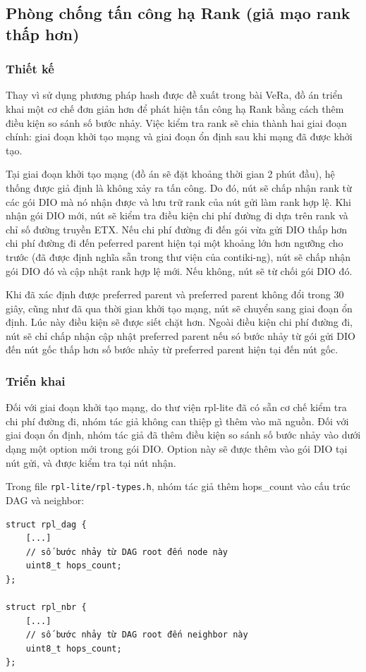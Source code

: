 \subsection{Phòng chống tấn công hạ Rank (giả mạo rank thấp hơn)}
\label{prevention:rank-attacks}
\subsubsection{Thiết kế}
Thay vì sử dụng phương pháp hash được đề xuất trong bài VeRa, đồ án triển khai một cơ chế đơn giản hơn để phát hiện tấn công hạ Rank bằng cách thêm điều kiện so sánh số bước nhảy. Việc kiểm tra rank sẽ chia thành hai giai đoạn chính: giai đoạn khởi tạo mạng và giai đoạn ổn định sau khi mạng đã được khởi tạo.

Tại giai đoạn khởi tạo mạng (đồ án sẽ đặt khoảng thời gian 2 phút đầu), hệ thống được giả định là không xảy ra tấn công. Do đó, nút sẽ chấp nhận rank từ các gói DIO mà nó nhận được và lưu trữ rank của nút gửi làm rank hợp lệ. Khi nhận gói DIO mới, nút sẽ kiểm tra điều kiện chi phí đường đi dựa trên rank và chỉ số đường truyền ETX. Nếu chi phí đường đi đến gói vừa gửi DIO thấp hơn chi phí đường đi đến peferred parent hiện tại một khoảng lớn hơn ngưỡng cho trước (đã được định nghĩa sẵn trong thư viện của contiki-ng), nút sẽ chấp nhận gói DIO đó và cập nhật rank hợp lệ mới. Nếu không, nút sẽ từ chối gói DIO đó.

Khi đã xác định được preferred parent và preferred parent không đổi trong 30 giây, cũng như đã qua thời gian khởi tạo mạng, nút sẽ chuyển sang giai đoạn ổn định. Lúc này điều kiện sẽ được siết chặt hơn. Ngoài điều kiện chi phí đường đi, nút sẽ chỉ chấp nhận cập nhật preferred parent nếu só bước nhảy từ gói gửi DIO đến nút gốc thấp hơn số bước nhảy từ preferred parent hiện tại đến nút gốc.

\subsubsection{Triển khai}

Đối với giai đoạn khởi tạo mạng, do thư viện rpl-lite đã có sẵn cơ chế kiểm tra chi phí đường đi, nhóm tác giả không can thiệp gì thêm vào mã nguồn. Đối với giai đoạn ổn định, nhóm tác giả đã thêm điều kiện so sánh số bước nhảy vào dưới dạng một option mới trong gói DIO. Option này sẽ được thêm vào gói DIO tại nút gửi, và được kiểm tra tại nút nhận.

Trong file \texttt{rpl-lite/rpl-types.h}, nhóm tác giả thêm hops\_count vào cấu trúc DAG và neighbor:
\begin{verbatim}
struct rpl_dag {
    [...]
    // số bước nhảy từ DAG root đến node này
    uint8_t hops_count;
};

struct rpl_nbr {
    [...]
    // số bước nhảy từ DAG root đến neighbor này
    uint8_t hops_count;
};
\end{verbatim}

